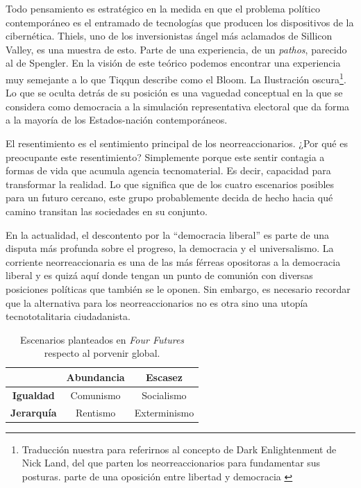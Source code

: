 Todo pensamiento es estratégico en la medida en que el problema político contemporáneo es el entramado de tecnologías que producen los dispositivos de la cibernética. Thiels, uno de los inversionistas ángel más aclamados de Sillicon Valley, es una muestra de esto. Parte de una experiencia, de un \emph{pathos}, parecido al de Spengler. En la visión de este teórico podemos encontrar una experiencia muy semejante a lo que Tiqqun describe como el Bloom. La Ilustración oscura\footnote{Traducción nuestra para referirnos al concepto de Dark Enlightenment de Nick Land, del que parten los neorreaccionarios para fundamentar sus posturas. \autocite{DarkEnlightenmentNick2012} parte de una oposición entre libertad y democracia \autocite[p.~5]{huiUnhappyConsciousnessNeoreactionaries2017}}. Lo que se oculta detrás de su posición es una vaguedad conceptual en la que se considera como democracia a la simulación representativa electoral que da forma a la mayoría de los Estados-nación contemporáneos.

El resentimiento es el sentimiento principal de los neorreaccionarios. ¿Por qué es preocupante este resentimiento? Simplemente porque este sentir contagia a formas de vida que acumula agencia tecnomaterial. Es decir, capacidad para transformar la realidad. Lo que significa que de los cuatro escenarios posibles para un futuro cercano, este grupo probablemente decida de hecho hacia qué camino transitan las sociedades en su conjunto.

En la actualidad, el descontento por la \enquote{democracia liberal} es parte de una disputa más profunda sobre el progreso, la democracia y el universalismo. La corriente neorreaccionaria es una de las más férreas opositoras a la democracia liberal y es quizá aquí donde tengan un punto de comunión con diversas posiciones políticas que también se le oponen. Sin embargo, es necesario recordar que la alternativa para los neorreaccionarios no es otra sino una utopía tecnototalitaria ciudadanista.

\begin{table}[htb]
  \caption{Escenarios planteados en \emph{Four Futures} respecto al porvenir global.}
  \label{tab:ubicua}
  \centering

  \begin{tabular}{ccc}
    \toprule
    & \textbf{Abundancia} & \textbf{Escasez}\\
    \midrule
    \textbf{Igualdad} & Comunismo & Socialismo\\
    \textbf{Jerarquía} & Rentismo & Exterminismo\\
    \bottomrule
  \end{tabular}
\end{table}


